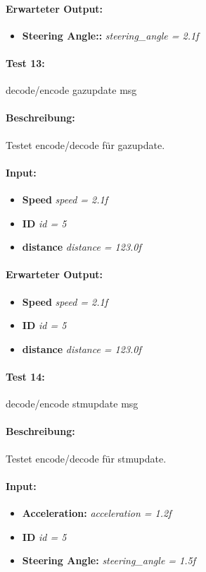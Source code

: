 \documentclass[a4paper, 12pt, titlepage]{scrartcl}
\begin{document}
{			\paragraph{Erwarteter Output:}
			\begin{itemize} \itemsep-0.5em
				\item \textbf{Steering Angle::} \emph{steering\_angle = 2.1f}
			\end{itemize}
			
			\paragraph{Test 13:}{decode/encode gazupdate msg}
			\paragraph{Beschreibung:} Testet encode/decode für gazupdate.
			\paragraph{Input:}
			\begin{itemize} \itemsep-0.5em
				\item \textbf{Speed} \emph{speed = 2.1f}
				\item \textbf{ID} \emph{id = 5}
				\item \textbf{distance} \emph{distance = 123.0f}
			\end{itemize}
			\paragraph{Erwarteter Output:}
			\begin{itemize} \itemsep-0.5em
				\item \textbf{Speed} \emph{speed = 2.1f}
				\item \textbf{ID} \emph{id = 5}
				\item \textbf{distance} \emph{distance = 123.0f}
			\end{itemize}
			
			\paragraph{Test 14:}{decode/encode stmupdate msg}
			\paragraph{Beschreibung:} Testet encode/decode für stmupdate.
			\paragraph{Input:}
			\begin{itemize} \itemsep-0.5em
				\item \textbf{Acceleration:} \emph{acceleration = 1.2f}
				\item \textbf{ID} \emph{id = 5}
				\item \textbf{Steering Angle:} \emph{steering\_angle = 1.5f}
			\end{itemize}
}
\end{document}

